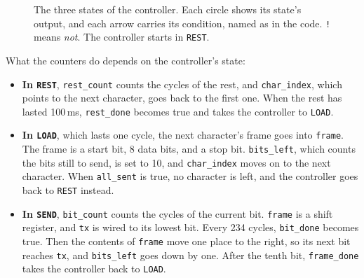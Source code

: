 \documentclass[11pt,a4paper]{article}
\begin{document}
\begin{figure}[H]
  \centering
  \caption{The three states of the controller. Each circle shows its state’s output, and each arrow carries its condition, named as in the code. \texttt{!} means \emph{not}. The controller starts in \texttt{REST}.}
\end{figure}

What the counters do depends on the controller’s state:
\begin{itemize}
  \item \textbf{In \texttt{REST}}, \texttt{rest\_count} counts the cycles of the rest, and \texttt{char\_index}, which points to the next character, goes back to the first one. When the rest has lasted 100\,ms, \texttt{rest\_done} becomes true and takes the controller to \texttt{LOAD}.
  \item \textbf{In \texttt{LOAD}}, which lasts one cycle, the next character’s frame goes into \texttt{frame}. The frame is a start bit, 8 data bits, and a stop bit. \texttt{bits\_left}, which counts the bits still to send, is set to 10, and \texttt{char\_index} moves on to the next character. When \texttt{all\_sent} is true, no character is left, and the controller goes back to \texttt{REST} instead.
  \item \textbf{In \texttt{SEND}}, \texttt{bit\_count} counts the cycles of the current bit. \texttt{frame} is a shift register, and \texttt{tx} is wired to its lowest bit. Every 234 cycles, \texttt{bit\_done} becomes true. Then the contents of \texttt{frame} move one place to the right, so its next bit reaches \texttt{tx}, and \texttt{bits\_left} goes down by one. After the tenth bit, \texttt{frame\_done} takes the controller back to \texttt{LOAD}.
\end{itemize}
\end{document}
